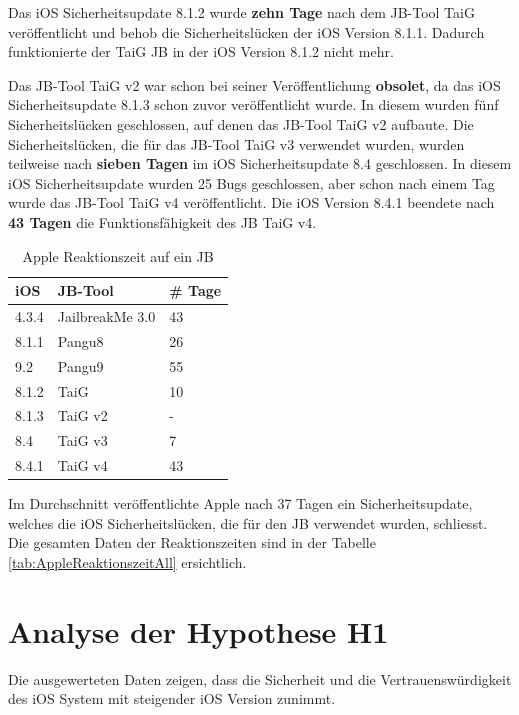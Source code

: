 Das iOS Sicherheitsupdate 8.1.2 wurde \textbf{zehn Tage} nach dem JB-Tool TaiG veröffentlicht und behob die Sicherheitslücken der iOS Version 8.1.1. Dadurch funktionierte der TaiG JB in der iOS Version 8.1.2 nicht mehr.

Das JB-Tool TaiG v2 war schon bei seiner Veröffentlichung \textbf{obsolet}, da das iOS Sicherheitsupdate 8.1.3 schon zuvor veröffentlicht wurde. In diesem wurden fünf Sicherheitslücken geschlossen, auf denen das JB-Tool TaiG v2 aufbaute.
Die Sicherheitslücken, die für das JB-Tool TaiG v3 verwendet wurden, wurden teilweise nach \textbf{sieben Tagen} im iOS Sicherheitsupdate 8.4 geschlossen. In diesem iOS Sicherheitsupdate wurden 25 Bugs geschlossen, aber schon nach einem Tag wurde das JB-Tool TaiG v4 veröffentlicht. Die iOS Version 8.4.1 beendete nach \textbf{43 Tagen} die Funktionsfähigkeit des JB TaiG v4.

\begin{table}[htp!]
    \begin{center}
        \begin{tabular}{| p{10mm} | p{40mm} | p{17mm} |} \hline
            \textbf{iOS} & \textbf{JB-Tool} & \textbf{\# Tage} \\ \hline 
                4.3.4 & JailbreakMe 3.0 & 43 \\ \hline
                8.1.1 & Pangu8 & 26 \\ \hline
                9.2 & Pangu9 & 55 \\ \hline
                8.1.2 & TaiG & 10  \\ \hline
                 8.1.3 & TaiG v2 & - \\ \hline
                  8.4 & TaiG v3 & 7  \\ \hline
                  8.4.1 & TaiG v4 & 43  \\ \hline
        \end{tabular} 
        \caption{Apple Reaktionszeit auf ein JB \protect\footnotemark}
        \label{tab:AppleReaktionszeit}
    \end{center}
\end{table}
Im Durchschnitt veröffentlichte Apple nach 37 Tagen ein Sicherheitsupdate, welches die iOS Sicherheitslücken, die für den JB verwendet wurden, schliesst. Die gesamten Daten der Reaktionszeiten sind in der Tabelle \ref{tab:AppleReaktionszeitAll} ersichtlich.  

\section{Analyse der Hypothese H1}
\label{sec:AnalyseHypo}
Die ausgewerteten Daten zeigen, dass die Sicherheit und die Vertrauenswürdigkeit des iOS System mit steigender iOS Version zunimmt. 

